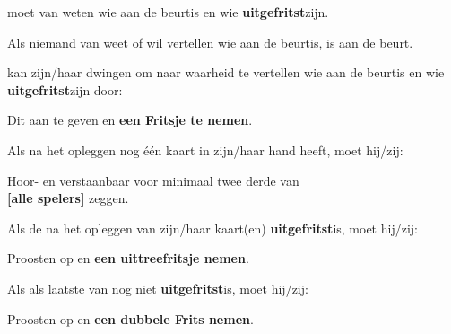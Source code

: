 \newpage
{}
\label{sec:beurten_en_zetten_einde}


\vervolgLijst{}
    \item \EenSpeler moet van \alleSpelers weten wie aan de beurt\footnotemark[1] is en wie \textbf{uitgefritst}\footnotemark[2] zijn.
\eindLijst{}

\vervolgLijst{}
    \item Als niemand van \alleSpelers weet of wil vertellen wie aan de beurt\footnotemark[1] is, is \Frits aan de beurt\footnotemark[1].
\eindLijst{}

\vervolgLijst{}
    \item \EenSpeler kan zijn/haar \medeSpelers dwingen om naar waarheid te vertellen wie aan de beurt\footnotemark[1] is en wie \textbf{uitgefritst}\footnotemark[2] zijn door:
    \puntLijst{}
        \item Dit aan te geven en \textbf{een Fritsje te nemen}\footnotemark[3].
    \eindPuntLijst{}
\eindLijst{}


\vervolgLijst{}
    \item Als \eenSpeler na het opleggen nog \'e\'en kaart in zijn/haar hand heeft, moet hij/zij:
    \puntLijst{}
        \item Hoor- en verstaanbaar  voor minimaal twee derde van \\ \textbf{[alle spelers]} zeggen.
    \eindPuntLijst{}
    \label{regel:laatste_frits_1}
\eindLijst{}

\vervolgLijst{}
    \item Als de \huidigeSpeler na het opleggen van zijn/haar kaart(en) \textbf{uitgefritst}\footnotemark[4] is, moet hij/zij:
    \puntLijst{}
        \item Proosten op  en \textbf{een uittreefritsje nemen}\footnotemark[3].
    \eindPuntLijst{}
    \label{regel:laatste_frits_2}
\eindLijst{}

\vervolgLijst{}
    \item Als \eenSpeler als laatste van \alleSpelers nog niet \textbf{uitgefritst}\footnotemark[2] is, moet hij/zij:
    \puntLijst{}
        \item Proosten op  en \textbf{een dubbele Frits nemen}\footnotemark[4].
    \eindPuntLijst{}
\eindLijst{}

